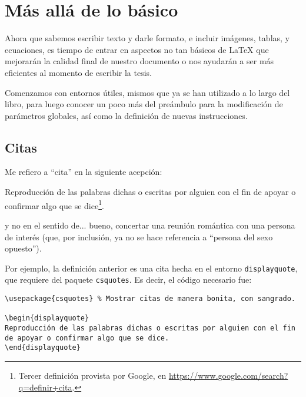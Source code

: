\chapter{Más allá de lo básico}
\label{cha:no_tan_basico}



Ahora que sabemos escribir texto y darle formato, e incluir imágenes, tablas, y ecuaciones, es tiempo de entrar en aspectos no tan básicos de \LaTeX{} que mejorarán la calidad final de nuestro documento o nos ayudarán a ser más eficientes al momento de escribir la tesis.

Comenzamos con entornos útiles, mismos que ya se han utilizado a lo largo del libro, para luego conocer un poco más del preámbulo para la modificación de parámetros globales, así como la definición de nuevas instrucciones.



\section{Citas}
\label{sec:citas}



Me refiero a ``cita'' en la siguiente acepción:

\begin{displayquote}
Reproducción de las palabras dichas o escritas por alguien con el fin de apoyar o confirmar algo que se dice\footnote{Tercer definición provista por Google, en \href{https://www.google.com/search?q=definir+cita}{https://www.google.com/search?q=definir+cita}.}.
\end{displayquote}

\noindent y no en el sentido de... bueno, concertar una reunión romántica con una persona de interés (que, por inclusión, ya no se hace referencia a ``persona del sexo opuesto'').

Por ejemplo, la definición anterior es una cita hecha en el entorno \texttt{displayquote}, que requiere del paquete \texttt{csquotes}. Es decir, el código necesario fue:

\begin{lstlisting}[style=latex]
% Agregar el siguiente paquete en el preámbulo:
\usepackage{csquotes} % Mostrar citas de manera bonita, con sangrado.

\begin{displayquote}
Reproducción de las palabras dichas o escritas por alguien con el fin de apoyar o confirmar algo que se dice.
\end{displayquote}
\end{lstlisting}



